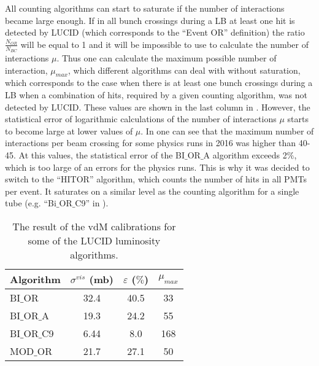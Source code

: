 % 
% 
All counting algorithms can start to saturate if the number of interactions became large enough.
If in all bunch crossings during a LB at least one hit is detected by LUCID (which corresponds to the ``Event OR'' definition) 
the ratio $\frac{N_{OR}}{N_{BC}}$ will be equal to 1 and it will be impossible to use  to calculate 
the number of interactions $\mu$. 
Thus one can calculate the maximum possible number of interaction,
$\mu_{max}$, which different algorithms can deal with without saturation, 
which corresponds to the case when there is at least one bunch crossings during a LB
when a combination of hits, required by a given counting algorithm, was not detected by LUCID.
These values are shown in the last column in .
However, the statistical error of logarithmic calculations of the number of interactions $\mu$ starts to become large at lower values of $\mu$.
In  one can see that the maximum number of interactions per beam crossing for some physics runs in 2016 was higher than 40-45. At this values, the statistical error of the BI$\_$OR$\_$A algorithm exceeds 2$\%$, which is too large of an errors for the physics runs.
This is why it was decided to switch to the ``HITOR'' algorithm, which counts the number of hits in all PMTs per event.
It saturates on a similar level as the counting algorithm for a single tube (e.g. ``Bi$\_$OR$\_$C9'' in ).

\begin{table}[h]
  \begin{tabular}{|l|c|c|c|}
    Algorithm & $\sigma^{vis}$ (mb) & $\varepsilon$ ($\%$) & $\mu_{max}$ \\
    \hline
    BI$\_$OR & 32.4 & 40.5 & 33 \\
    \hline
    BI$\_$OR$\_$A & 19.3 & 24.2 & 55 \\
    \hline
    BI$\_$OR$\_$C9 & 6.44 & 8.0 & 168 \\
    \hline
    MOD$\_$OR & 21.7 & 27.1 & 50 \\
  \end{tabular}
  \caption{The result of the vdM calibrations for some of the LUCID luminosity algorithms.}
  \label{tab:sigma_vis_efficiency}
\end{table}

